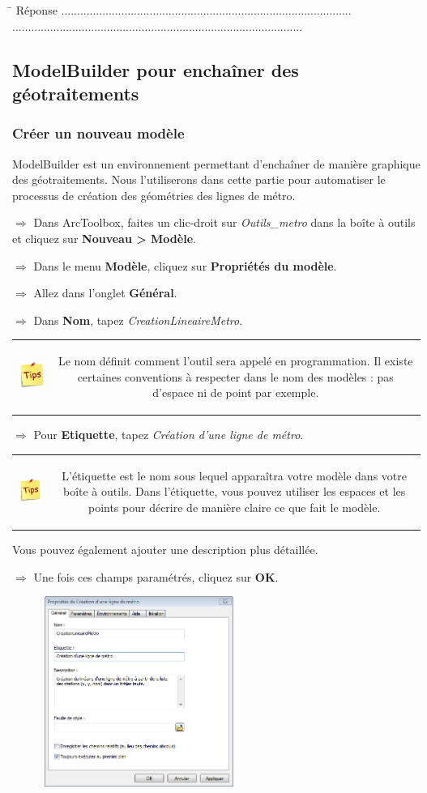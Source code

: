 \documentclass[11pt]{article}
\newcommand{\action}{$\Rightarrow$ }
\newcommand{\reponse}{
	\begin{tabbing}
	\hspace{2cm}\=\kill
	Réponse \> ............................................................................................ \\ 
 	\> ............................................................................................
	\end{tabbing}
}
\newenvironment{note}{%
	\begin{tabular}[t t]{c c}
		\includegraphics{img/tips.png}
		 &
		\begin{minipage}[c]{0.9\linewidth}
			\begin{sffamily}
}{%
			\end{sffamily}
		\end{minipage}
	\end{tabular}	
}
\begin{document}
\reponse


\subsection{ModelBuilder pour enchaîner des géotraitements}
\label{modelbuilder}
\subsubsection{Créer un nouveau modèle}
ModelBuilder est un environnement permettant d'enchaîner de manière graphique des géotraitements. Nous l'utiliserons dans cette partie pour automatiser le processus de création des géométries des lignes de métro.

\action Dans ArcToolbox, faites un clic-droit sur \textit{Outils\_metro} dans la boîte à outils et cliquez sur \textbf{Nouveau > Modèle}.

\action Dans le menu \textbf{Modèle}, cliquez sur \textbf{Propriétés du modèle}.

\action Allez dans l’onglet \textbf{Général}.

\action Dans \textbf{Nom}, tapez \textit{CreationLineaireMetro}.

\begin{note}
Le nom définit comment l'outil sera appelé en programmation. Il existe certaines conventions à respecter dans le nom des modèles : pas d'espace ni de point par exemple.
\end{note}

\action Pour \textbf{Etiquette}, tapez \textit{Création d'une ligne de métro}.

\begin{note}
L'étiquette est le nom sous lequel apparaîtra votre modèle dans votre boîte à outils. Dans l'étiquette, vous pouvez utiliser les espaces et les points pour décrire de manière claire ce que fait le modèle.
\end{note}

Vous pouvez également ajouter une description plus détaillée.

\action Une fois ces champs paramétrés, cliquez sur \textbf{OK}.
\begin{figure}[H]
	\center \includegraphics[width=0.55\textwidth]{img/td3/modelbuilder_creation.png}\\
\end{figure}
\end{document}
